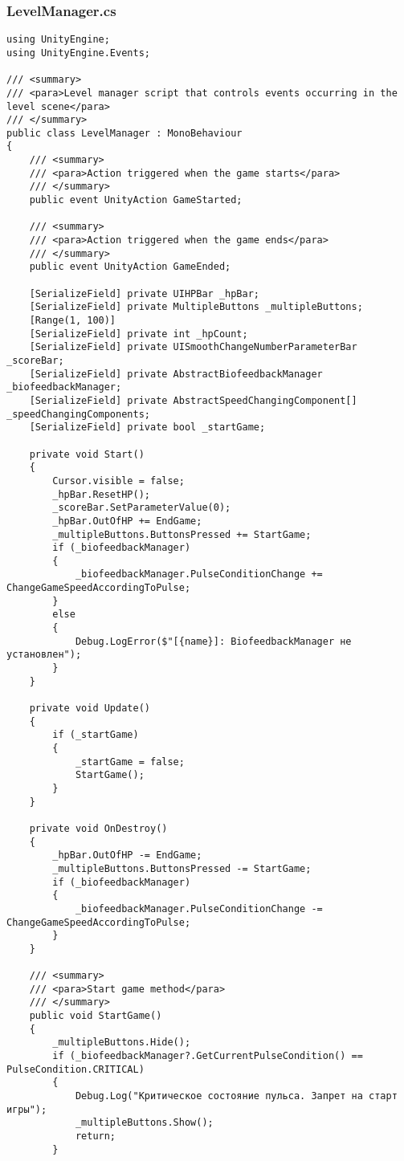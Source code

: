 \subsubsection*{LevelManager.cs}
\begin{verbatim}
using UnityEngine;
using UnityEngine.Events;

/// <summary>
/// <para>Level manager script that controls events occurring in the level scene</para>
/// </summary>
public class LevelManager : MonoBehaviour
{
    /// <summary>
    /// <para>Action triggered when the game starts</para>
    /// </summary>
    public event UnityAction GameStarted;

    /// <summary>
    /// <para>Action triggered when the game ends</para>
    /// </summary>
    public event UnityAction GameEnded;

    [SerializeField] private UIHPBar _hpBar;
    [SerializeField] private MultipleButtons _multipleButtons;
    [Range(1, 100)] 
    [SerializeField] private int _hpCount;
    [SerializeField] private UISmoothChangeNumberParameterBar _scoreBar;
    [SerializeField] private AbstractBiofeedbackManager _biofeedbackManager;
    [SerializeField] private AbstractSpeedChangingComponent[] _speedChangingComponents;
    [SerializeField] private bool _startGame;

    private void Start()
    {
        Cursor.visible = false;
        _hpBar.ResetHP();
        _scoreBar.SetParameterValue(0);
        _hpBar.OutOfHP += EndGame;
        _multipleButtons.ButtonsPressed += StartGame;
        if (_biofeedbackManager)
        {
            _biofeedbackManager.PulseConditionChange += ChangeGameSpeedAccordingToPulse;
        }
        else
        {
            Debug.LogError($"[{name}]: BiofeedbackManager не установлен");
        }
    }

    private void Update()
    {
        if (_startGame)
        {
            _startGame = false;
            StartGame();
        }
    }

    private void OnDestroy()
    {
        _hpBar.OutOfHP -= EndGame;
        _multipleButtons.ButtonsPressed -= StartGame;
        if (_biofeedbackManager)
        {
            _biofeedbackManager.PulseConditionChange -= ChangeGameSpeedAccordingToPulse;
        }
    }

    /// <summary>
    /// <para>Start game method</para>
    /// </summary>
    public void StartGame()
    {
        _multipleButtons.Hide();
        if (_biofeedbackManager?.GetCurrentPulseCondition() == PulseCondition.CRITICAL)
        {
            Debug.Log("Критическое состояние пульса. Запрет на старт игры");
            _multipleButtons.Show();
            return;
        }


\end{verbatim}
